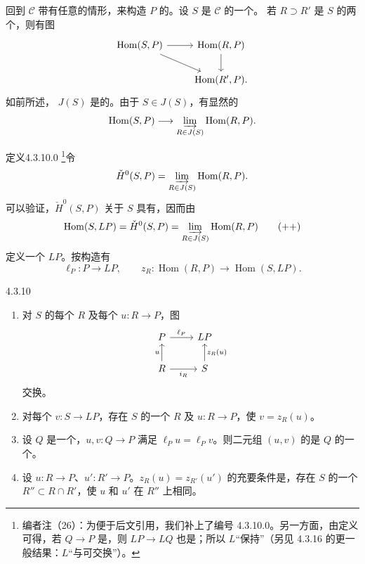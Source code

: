 回到 $\mathcal C$ 带有任意的情形，来构造 $P$ 的。设 $S$ 是 $\mathcal C$ 的一个。
若 $R\supset R'$ 是 $S$ 的两个，则有图
\[
\begin{tikzcd}
\operatorname{Hom}(S,P)\arrow[r]\arrow[dr]&\operatorname{Hom}(R,P)\arrow[d]\\
&\operatorname{Hom}(R',P).
\end{tikzcd}
\]
如前所述， $J(S)$ 是的。由于 $S\in J(S)$，有显然的
\[
\operatorname{Hom}(S,P)\longrightarrow\varinjlim_{R\in J(S)}\operatorname{Hom}(R,P).
\]
\begin{SGAresult}{定义}{4.3.10.0}
\footnote{编者注（26）：为便于后文引用，我们补上了编号 4.3.10.0。另一方面，由定义可得，若 $Q\to P$ 是，则 $LP\to LQ$ 也是；所以 $L$“保持”（另见 4.3.16 的更一般结果：$L$“与可交换”）。}令
\[
\check H^0(S,P)=\varinjlim_{R\in J(S)}\operatorname{Hom}(R,P).
\]
可以验证，$\check H^0(S,P)$ 关于 $S$ 具有，因而由
\[
\operatorname{Hom}(S,LP)=\check H^0(S,P)=\varinjlim_{R\in J(S)}\operatorname{Hom}(R,P)\tag{++}
\]
定义一个 $LP$。按构造有
\[
\ell_P:P\longrightarrow LP,\qquad
z_R:\operatorname{Hom}(R,P)\longrightarrow\operatorname{Hom}(S,LP).
\]
\end{SGAresult}
\begin{SGAresult}{}{4.3.10}
\begin{enumerate}
\item[(i)] 对 $S$ 的每个 $R$ 及每个 $u:R\to P$，图
\[
\begin{tikzcd}
P\arrow[r,"\ell_P"]&LP\\
R\arrow[u,"u"]\arrow[r,"i_R"']&S\arrow[u,"z_R(u)"']
\end{tikzcd}
\]
交换。
\item[(ii)] 对每个 $v:S\to LP$，存在 $S$ 的一个 $R$ 及 $u:R\to P$，使 $v=z_R(u)$。
\item[(iii)] 设 $Q$ 是一个，$u,v:Q\to P$ 满足 $\ell_Pu=\ell_Pv$。则二元组 $(u,v)$ 的是 $Q$ 的一个。
\item[(iv)] 设 $u:R\to P$、$u':R'\to P$。$z_R(u)=z_{R'}(u')$ 的充要条件是，存在 $S$ 的一个 $R''\subset R\cap R'$，使 $u$ 和 $u'$ 在 $R''$ 上相同。
\end{enumerate}
\end{SGAresult}
